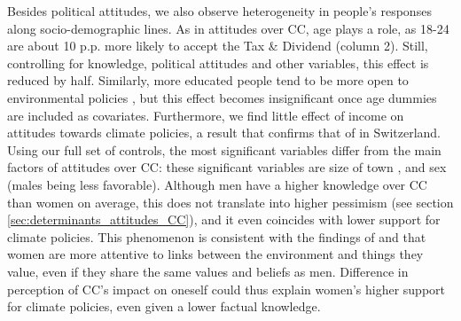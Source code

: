 \documentclass[english,5p,authoryear]{elsarticle}
\begin{document}
Besides political attitudes, we also observe heterogeneity in people's responses along socio-demographic lines. As in attitudes over CC, age plays a role, as 18-24 are about 10 p.p. more likely to accept the Tax \& Dividend (column 2). Still, controlling for knowledge, political attitudes and other variables, this effect is reduced by half. Similarly, more educated people tend to be more open to environmental policies \citep[as previously found by][]{thalmann_public_2004}, but this effect becomes insignificant once age dummies are included as covariates. Furthermore, we find little effect of income on attitudes towards climate policies, a result that confirms that of \citet{thalmann_public_2004} in Switzerland. Using our full set of controls, the most significant variables differ from the main factors of attitudes over CC: these significant variables are size of town \citep[city dwellers being more favorable to environmental policies, as in][]{thalmann_public_2004}, and sex (males being less favorable). Although men have a higher knowledge over CC than women on average, this does not translate into higher pessimism (see section \ref{sec:determinants_attitudes_CC}), and it even coincides with lower support for climate policies. This phenomenon is consistent with the findings of \citet{stern_value_1993} and \citet{hampel_gender_1996} that women are more attentive to links between the environment and things they value, even if they share the same values and beliefs as men. Difference in perception of CC's impact on oneself could thus explain women's higher support for climate policies, even given a lower factual knowledge.


\end{document}
